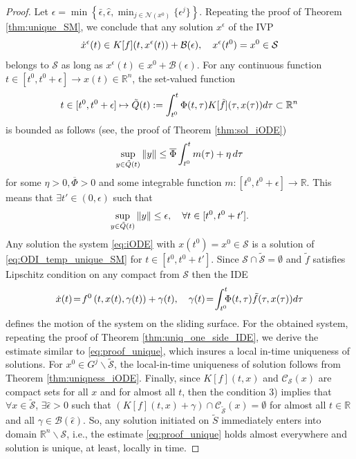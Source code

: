 \documentclass{article}
\newcommand{\R}{\mathbb{R}}
\begin{document}
\begin{proof}
	Let $\epsilon =\min\left\{\bar \epsilon,\hat \epsilon, \min_{j\in \mathcal{N}(x^0)}\{\epsilon^j\}\right\}$.
	Repeating the proof of Theorem \ref{thm:unique_SM},  we conclude  that any solution 
	$x^{\epsilon}$
	of the IVP\vspace{-1mm}
	\begin{equation}\label{eq:ODI_temp_unique_SM}
		\dot x^{\epsilon}(t)\in K[f](t,x^{\epsilon}(t))+\mathcal{B}(\epsilon), \quad x^{\epsilon}(t^0)=x^0\in \mathcal{S}\vspace{-1mm}
	\end{equation}
	belongs to $\mathcal{S}$	as long as $x^{\epsilon}(t)\in x^0+\mathcal{B}(\epsilon)$. 
	For any continuous function $t\in [t^0,t^0+\epsilon]\to x(t)\in \R^n$, the set-valued function \vspace{-1mm}
	$$
	t\in [t^0,t^0+\epsilon]\mapsto \tilde Q(t):=\int^t_{t^0} \Phi(t,\tau) K[\tilde f](\tau,x(\tau)) d\tau\subset \R^n\vspace{-1mm}
	$$ is bounded as follows (see, the proof of Theorem \ref{thm:sol_iODE})\vspace{-1mm}
	\[
	\sup_{y\in \tilde Q(t)} \|y\|\leq \overline{\Phi}\int^t_{t^0}m(\tau) +\eta\, d\tau\vspace{-1mm}
	\]
	for some $\eta>0, \overline{\Phi}>0$ and some integrable function $m:[t^0,t^0+\epsilon]\to \R$. This means that $\exists t'\in (0,\epsilon)$ such that \vspace{-1mm}
	\[
	\sup_{y\in \tilde Q(t)} \|y\|\leq\epsilon, \quad \forall t\in [t^0,t^0+t'].\vspace{-1mm}
	\]
	Any solution the system \eqref{eq:iODE} with $x(t^0)=x^0\in \mathcal{S}$ is a solution of \eqref{eq:ODI_temp_unique_SM} for  $t\in[t^0,t^0+t']$. Since $\mathcal{S}\cap \tilde {\mathcal{S}}=\emptyset$  and  $\tilde f$ satisfies Lipschitz condition on any compact from $\mathcal{S}$  then  the IDE\vspace{-1mm}
	\begin{equation*}
\dot x(t)\!=\!f^0\left(t,x(t),\gamma(t)\right)+\gamma(t), \quad \gamma(t)\!=\!\int^t_{t^0}\!\!\!\Phi(t,\tau) \tilde f(\tau,x(\tau)) d\tau\vspace{-1mm}
	\end{equation*}
   defines the motion of the system on the sliding surface. 
  {For the obtained system, repeating the proof of Theorem  \ref{thm:uniq_one_side_IDE}, we derive the estimate similar to \eqref{eq:proof_unique}, which insures a local in-time uniqueness of solutions.  	For $x^0\in  G^j\backslash \tilde{\mathcal{S}}$, the local-in-time  uniqueness of solution  follows from  Theorem \ref{thm:uniqness_iODE}.  Finally, since $K[f](t,x)$ and $\mathcal{C}_{\mathcal{S}}(x)$ are compact sets  for all $x$ and for almost all $t$, then the condition 3) implies that 
  	$\forall x\in \tilde {\mathcal{S}}$, $\exists \hat \epsilon\!>\!0$ such that  $\left(K[f](t,x)+\gamma \right)\cap \mathcal{C}_{\tilde{\mathcal{S}}}(x)=\emptyset$  for almost all $t\in \R$ and 
  	all $\gamma\in \mathcal{B}(\hat \epsilon)$.
  	So, any solution  initiated on $\tilde S$ immediately enters into  domain $\R^n\backslash\mathcal{S}$, i.e., the estimate \eqref{eq:proof_unique} holds almost everywhere and solution is unique, at least, locally in time.}
\end{proof}
\end{document}
